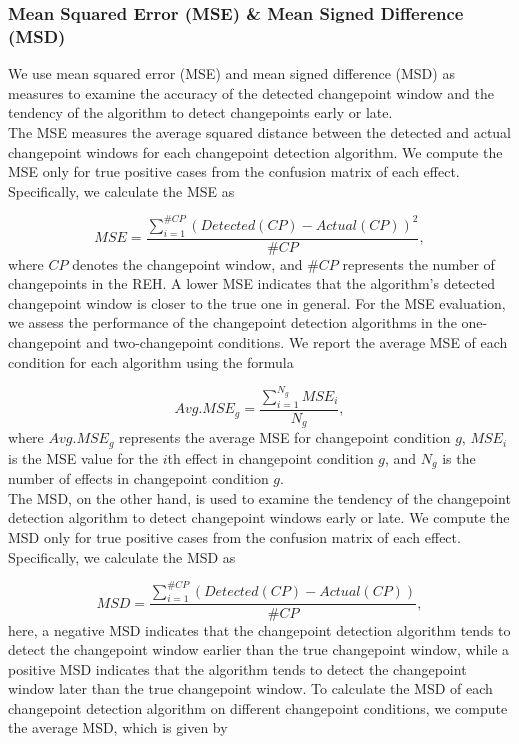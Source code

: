 \documentclass[]{interact}
\theoremstyle{plain}%
\theoremstyle{definition}
\theoremstyle{remark}
\begin{document}
	\subsubsection{Mean Squared Error (MSE) \& Mean Signed Difference (MSD)} \label{sec:MSE MSD}
	
	\hspace{0.28cm} We use mean squared error (MSE) and mean signed difference (MSD) as measures to examine the accuracy of the detected changepoint window and the tendency of the algorithm to detect changepoints early or late. \\
	
	The MSE measures the average squared distance between the detected and actual changepoint windows for each changepoint detection algorithm. We compute the MSE only for true positive cases from the confusion matrix of each effect. Specifically, we calculate the MSE as \cite{aminikhanghahiSurveyMethodsTime2017}
	
	\begin{equation} \label{9}
		MSE = \frac{\sum_{i = 1}^{\#CP} (Detected(CP) - Actual(CP))^2}{\#CP},
	\end{equation}
	where $CP$ denotes the changepoint window, and $\#CP$ represents the number of changepoints in the REH. A lower MSE indicates that the algorithm's detected changepoint window is closer to the true one in general. For the MSE evaluation, we assess the performance of the changepoint detection algorithms in the one-changepoint and two-changepoint conditions. We report the average MSE of each condition for each algorithm using the formula
	
	\begin{equation} \label{10}
		Avg.MSE_g = \frac{\sum_{i=1}^{N_g} MSE_i}{N_g},
	\end{equation}
	where $Avg.MSE_g$ represents the average MSE for changepoint condition $g$, $MSE_i$ is the MSE value for the $i$th effect in changepoint condition $g$, and $N_g$ is the number of effects in changepoint condition $g$. \\
	
	The MSD, on the other hand, is used to examine the tendency of the changepoint detection algorithm to detect changepoint windows early or late. We compute the MSD only for true positive cases from the confusion matrix of each effect. Specifically, we calculate the MSD as
	
	\begin{equation} \label{11}
		MSD = \frac{\sum_{i = 1}^{\#CP} (Detected(CP) - Actual(CP))}{\#CP},
	\end{equation}
	here, a negative MSD indicates that the changepoint detection algorithm tends to detect the changepoint window earlier than the true changepoint window, while a positive MSD indicates that the algorithm tends to detect the changepoint window later than the true changepoint window. To calculate the MSD of each changepoint detection algorithm on different changepoint conditions, we compute the average MSD, which is given by
	
\end{document}
